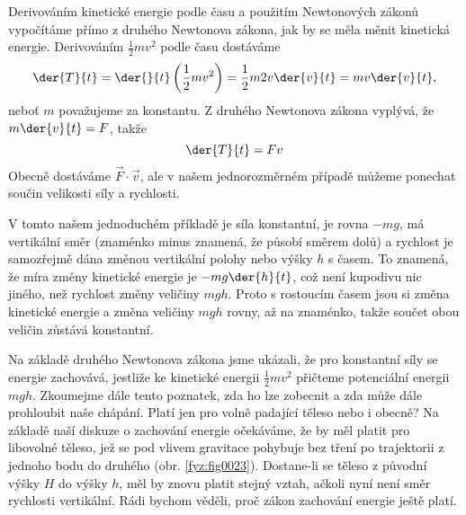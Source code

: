     Derivováním kinetické energie podle času a použitím Newtonových zákonů vypočítáme přímo z 
    druhého Newtonova zákona, jak by se měla měnit kinetická energie. Derivováním 
    \(\frac{1}{2}mv^2\) podle času dostáváme
    \begin{equation}\label{fyz:eq026}
      \der{T}{t} = \der{ }{t}\left(\frac{1}{2}mv^2\right) = \frac{1}{2}m2v\der{v}{t} 
                 = mv\der{v}{t},
    \end{equation}
    neboť \(m\) považujeme za konstantu. Z druhého Newtonova zákona vyplývá, že \(m\der{v}{t} = 
    F\), takže
    \begin{equation}\label{fyz:eq027}
      \der{T}{t} =Fv
    \end{equation}
    Obecně dostáváme \(\vec{F}\cdot\vec{v}\), ale v našem jednorozměrném případě můžeme ponechat 
    součin velikosti síly a rychlosti. 
    
    V tomto našem jednoduchém příkladě je síla konstantní, je rovna \(- mg\), má vertikální směr 
    (znaménko minus znamená, že působí směrem dolů) a rychlost je samozřejmě dána změnou vertikální 
    polohy nebo výšky \(h\) s časem. To znamená, že míra změny kinetické energie je \(- 
    mg\der{h}{t}\), což není kupodivu nic jiného, než rychlost změny veličiny \(mgh\). Proto s 
    rostoucím časem jsou si změna kinetické energie a změna veličiny \(mgh\) rovny, až na znaménko, 
    takže součet obou veličin zůstává konstantní.

    
    Na základě druhého Newtonova zákona jsme ukázali, že pro konstantní síly se energie zachovává, 
    jestliže ke kinetické energii \(\frac{1}{2}mv^2\) přičteme potenciální energii \(mgh\). 
    Zkoumejme dále tento poznatek, zda ho lze zobecnit a zda může dále prohloubit naše chápání. 
    Platí jen pro volně padající těleso nebo i obecně? Na základě naší diskuze o zachování energie 
    očekáváme, že by měl platit pro libovolné těleso, jež se pod vlivem gravitace pohybuje bez 
    tření po trajektorii z jednoho bodu do druhého (obr. \ref{fyz:fig0023}). Dostane-li se těleso z 
    původní výšky \(H\) do výšky \(h\), měl by znovu platit stejný vztah, ačkoli nyní není směr 
    rychlosti vertikální. Rádi bychom věděli, proč zákon zachování energie ještě platí.
    
